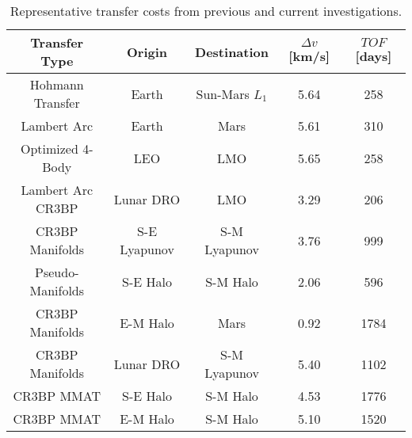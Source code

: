 \begin{table}[ht]
    \centering
    \caption{Representative transfer costs from previous and current investigations.}
    \begin{tabular}{|c|c|c|c|c|}
        \hline
        \textbf{Transfer Type}                      &   \textbf{Origin} &   \textbf{Destination}    &   \boldmath$\Delta v$ \textbf{[km/s]} &   \boldmath$TOF$ \textbf{[days]}  \\  \hline
        Hohmann Transfer                            &   Earth           &   Sun-Mars $L_{1}$        &   5.64                                &   258                             \\  \hline
        Lambert Arc\cite{Eagle:2022}                &   Earth           &   Mars                    &   5.61                                &   310                             \\  \hline
        Optimized 4-Body\cite{Miele:1999}           &   LEO             &   LMO                     &   5.65                                &   258                             \\  \hline
        Lambert Arc CR3BP\cite{Conte:2017}          &   Lunar DRO       &   LMO                     &   3.29                                &   206                             \\  \hline
        CR3BP Manifolds\cite{Topputo:2005}          &   S-E Lyapunov    &   S-M Lyapunov            &   3.76                                &   999                             \\  \hline
        Pseudo-Manifolds\cite{Haibin:2014}          &   S-E Halo        &   S-M Halo                &   2.06                                &   596                             \\  \hline
        CR3BP Manifolds\cite{Kakoi:2014}            &   E-M Halo        &   Mars                    &   0.92                                &   1784                            \\  \hline
        CR3BP Manifolds\cite{Cavallari:2019}        &   Lunar DRO       &   S-M Lyapunov            &   5.40                                &   1102                            \\  \hline
        CR3BP MMAT\cite{Canales:2022}               &   S-E Halo        &   S-M Halo                &   4.53                                &   1776                            \\  \hline
        CR3BP MMAT                                  &   E-M Halo        &   S-M Halo                &   5.10                                &   1520                            \\  \hline
    \end{tabular}
    \label{tab:transferCosts}
\end{table}

